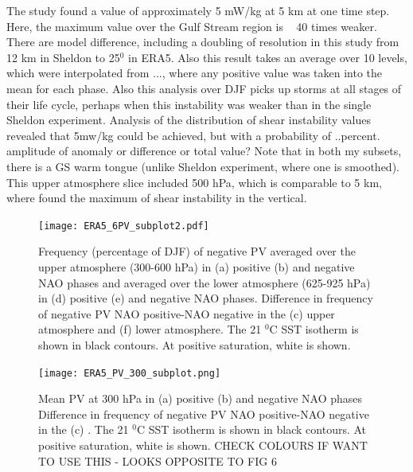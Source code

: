 The \citet{sheldon2017warm} study found a value of approximately 5 mW/kg at 5 km at one time step. Here, the maximum value over the Gulf Stream region is ~ 40 times weaker. There are model difference, including a doubling of resolution in this study from 12 km in Sheldon to 25$^{0}$ in ERA5. Also this result takes an average over 10 levels, which were interpolated from ..., where any positive value was taken into the mean for each phase. Also this analysis over DJF picks up storms at all stages of their life cycle, perhaps when this instability was weaker than in the single Sheldon experiment. Analysis of the distribution of shear instability values revealed that 5mw/kg could be achieved, but with a probability of ..percent. amplitude of anomaly or difference or total value?
Note that in both my subsets, there is a GS warm tongue (unlike Sheldon experiment, where one is smoothed).
This upper atmosphere slice included 500 hPa, which is comparable to 5 km, where \citet{sheldon2017warm} found the maximum of shear instability in the vertical. 



\begin{figure}[h]
	\centering
	\texttt{[image: ERA5\_6PV\_subplot2.pdf]}
	\caption{Frequency (percentage of DJF) of negative PV averaged over the upper atmosphere (300-600 hPa) in (a) positive (b) and negative NAO phases and averaged over the lower atmosphere (625-925 hPa) in (d) positive (e) and negative NAO phases. Difference in frequency of negative PV NAO positive-NAO negative in the (c) upper atmosphere and (f) lower atmosphere. The 21 $^{0}$C SST isotherm is shown in black contours. At positive saturation, white is shown.}
	\label{fig:ERA5_PV_count_cent}
\end{figure}

\begin{figure}[h]
	\centering
	\texttt{[image: ERA5\_PV\_300\_subplot.png]}
	\caption{Mean PV at 300 hPa in (a) positive (b) and negative NAO phases Difference in frequency of negative PV NAO positive-NAO negative in the (c) . The 21 $^{0}$C SST isotherm is shown in black contours. At positive saturation, white is shown. CHECK COLOURS IF WANT TO USE THIS - LOOKS OPPOSITE TO FIG 6}
	\label{fig:ERA5_PV_mean}
\end{figure}


